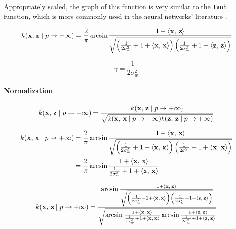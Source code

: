 Appropriately scaled, the graph of this function is very similar to the \texttt{tanh} function,
which is more commonly used in the neural networks' literature
\cite{williamsComputationInfiniteNeural1998}.

\begin{equation}\label{eq:kernel_asin}
	k(\mathbf{x},\,\mathbf{z} \mid p \to + \infty)  = \frac{2}{\pi}
	\arcsin \frac{1 + \left\langle \mathbf{x},\,\mathbf{z} \right\rangle}{\sqrt{
			\left(
			\frac{1}{2\sigma_w^2} + 1 + \left\langle \mathbf{x},\,\mathbf{x} \right\rangle
			\right)
			\left(
			\frac{1}{2\sigma_w^2} + 1 + \left\langle \mathbf{z},\,\mathbf{z} \right\rangle
			\right)
		}}
\end{equation}

\begin{equation}
	\gamma = \frac{1}{2\sigma_w^2}
\end{equation}

\paragraph{Normalization}

\begin{equation}\label{eq:normalized}
	\tilde{k}(\mathbf{x},\,\mathbf{z} \mid p \to + \infty) = \frac{
		k(\mathbf{x},\,\mathbf{z} \mid p \to + \infty) }{
		\sqrt{
			k(\mathbf{x},\,\mathbf{x} \mid p \to + \infty)
			k(\mathbf{z},\,\mathbf{z} \mid p \to + \infty)
		}
	}
\end{equation}

\begin{align*}\label{eq:kernel_asin_xx}
	k(\mathbf{x},\,\mathbf{x} \mid p \to + \infty)
	 & = \frac{2}{\pi}
	\arcsin \frac{1 + \left\langle \mathbf{x},\,\mathbf{x} \right\rangle}{\sqrt{
			\left(
			\frac{1}{2\sigma_w^2} + 1 + \left\langle \mathbf{x},\,\mathbf{x} \right\rangle
			\right)
			\left(
			\frac{1}{2\sigma_w^2} + 1 + \left\langle \mathbf{x},\,\mathbf{x} \right\rangle
			\right)
	}}                 \\
	 & = \frac{2}{\pi}
	\arcsin \frac{1 + \left\langle \mathbf{x},\,\mathbf{x} \right\rangle}{
		\frac{1}{2\sigma_w^2} + 1 + \left\langle \mathbf{x},\,\mathbf{x} \right\rangle
	}                  \\
\end{align*}

\begin{equation}
	\tilde{k}(\mathbf{x},\,\mathbf{z} \mid p \to + \infty) =
	\frac{
		\arcsin \frac{1 + \left\langle \mathbf{x},\,\mathbf{z} \right\rangle}{\sqrt{
				\left(
				\frac{1}{2\sigma_w^2} + 1 + \left\langle \mathbf{x},\,\mathbf{x} \right\rangle
				\right)
				\left(
				\frac{1}{2\sigma_w^2} + 1 + \left\langle \mathbf{z},\,\mathbf{z} \right\rangle
				\right)
			}}
	}{
		\sqrt{
			\arcsin \frac{1 + \left\langle \mathbf{x},\,\mathbf{x} \right\rangle}{
				\frac{1}{2\sigma_w^2} + 1 + \left\langle \mathbf{x},\,\mathbf{x} \right\rangle
			}
			\arcsin \frac{1 + \left\langle \mathbf{z},\,\mathbf{z} \right\rangle}{
				\frac{1}{2\sigma_w^2} + 1 + \left\langle \mathbf{z},\,\mathbf{z} \right\rangle
			}
		}
	}
\end{equation}

